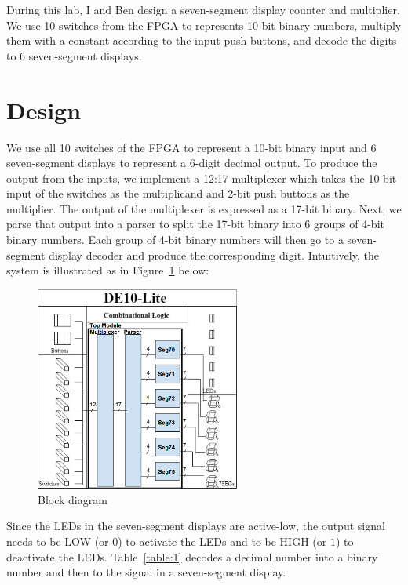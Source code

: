\documentclass[12pt]{article}
\begin{document}
During this lab, I and Ben design a seven-segment display counter and multiplier. We use 10 switches from the FPGA to represents 10-bit binary numbers, multiply them with a constant according to the input push buttons, and decode the digits to 6 seven-segment displays.

\section{Design}

We use all 10 switches of the FPGA to represent a 10-bit binary input and 6 seven-segment displays to represent a 6-digit decimal output. To produce the output from the inputs, we implement a 12:17 multiplexer which takes the 10-bit input of the switches as the multiplicand and 2-bit push buttons as the multiplier. The output of the multiplexer is expressed as a 17-bit binary. Next, we parse that output into a parser to split the 17-bit binary into 6 groups of 4-bit binary numbers. Each group of 4-bit binary numbers will then go to a seven-segment display decoder and produce the corresponding digit. Intuitively, the system is illustrated as in Figure~\ref{figure:2} below:

\begin{figure}[ht]
  \centering
  \includegraphics[width=0.6\textwidth]{lab4_block_diagram.png}
  \caption{Block diagram}
  \label{figure:2}
\end{figure}

Since the LEDs in the seven-segment displays are active-low, the output signal needs to be LOW (or $0$) to activate the LEDs and to be HIGH (or $1$) to deactivate the LEDs. Table~\ref{table:1} decodes a decimal number into a binary number and then to the signal in a seven-segment display.
\end{document}
